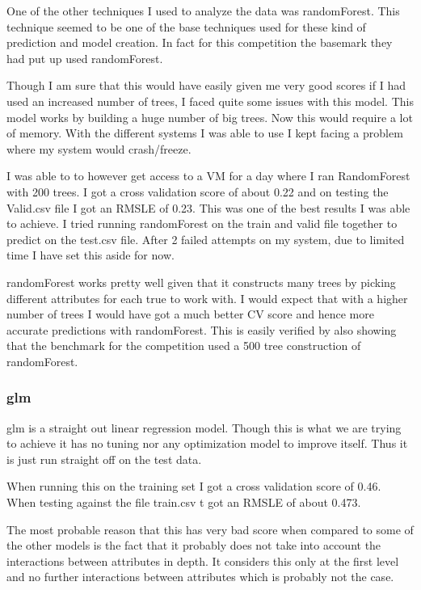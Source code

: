 \documentclass[paper=a4, fontsize=11pt]{scrartcl}	%
\numberwithin{equation}{section}		%
\numberwithin{figure}{section}			%
\numberwithin{table}{section}				%
\begin{document}
One of the other techniques I used to analyze the data was randomForest. This technique seemed to be one of the base techniques used for these kind of prediction and model creation. In fact for this competition the basemark they had put up used randomForest. 

Though I am sure that this would have easily given me very good scores if I had used an increased number of trees, I faced quite some issues with this model. This model works by building a huge number of big trees. Now this would require a lot of memory. With the different systems I was able to use I kept facing a problem where my system would crash/freeze.

I was able to to however get access to a VM for a day where I ran RandomForest with 200 trees. I got a cross validation score of about 0.22 and on testing the Valid.csv file I got an RMSLE of 0.23. This was one of the best results I was able to achieve. I tried running randomForest on the train and valid file together to predict on the test.csv file. After 2 failed attempts on my system, due to limited time I have set this aside for now.

randomForest works pretty well given that it constructs many trees by picking different attributes for each true to work with. I would expect that with a higher number of trees I would have got a much better CV score and hence more accurate predictions with randomForest. This is easily verified by also showing that the benchmark for the competition used a 500 tree construction of randomForest.

\subsubsection{glm}

glm is a straight out linear regression model. Though this is what we are trying to achieve it has no tuning nor any optimization model to improve itself. Thus it is just run straight off on the test data. 

When running this on the training set I got a cross validation score of 0.46. When testing against the file train.csv t got an RMSLE of about 0.473.

The most probable reason that this has very bad score when compared to some of the other models is the fact that it probably does not take into account the interactions between attributes in depth. It considers this only at the first level and no further interactions between attributes which is probably not the case.
\end{document}
